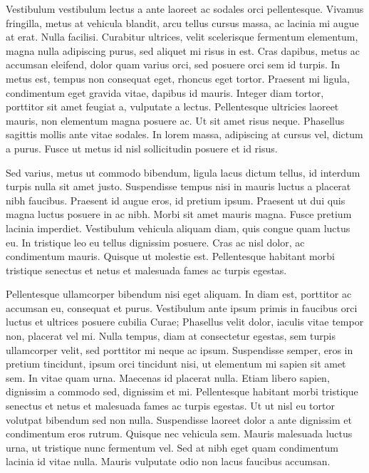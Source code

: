 \documentclass[a4paper]{article}
\begin{document}
Vestibulum vestibulum lectus a ante laoreet ac sodales orci pellentesque. Vivamus fringilla, metus at vehicula blandit, arcu tellus cursus massa, ac lacinia mi augue at erat. Nulla facilisi. Curabitur ultrices, velit scelerisque fermentum elementum, magna nulla adipiscing purus, sed aliquet mi risus in est. Cras dapibus, metus ac accumsan eleifend, dolor quam varius orci, sed posuere orci sem id turpis. In metus est, tempus non consequat eget, rhoncus eget tortor. Praesent mi ligula, condimentum eget gravida vitae, dapibus id mauris. Integer diam tortor, porttitor sit amet feugiat a, vulputate a lectus. Pellentesque ultricies laoreet mauris, non elementum magna posuere ac. Ut sit amet risus neque. Phasellus sagittis mollis ante vitae sodales. In lorem massa, adipiscing at cursus vel, dictum a purus. Fusce ut metus id nisl sollicitudin posuere et id risus.

Sed varius, metus ut commodo bibendum, ligula lacus dictum tellus, id interdum turpis nulla sit amet justo. Suspendisse tempus nisi in mauris luctus a placerat nibh faucibus. Praesent id augue eros, id pretium ipsum. Praesent ut dui quis magna luctus posuere in ac nibh. Morbi sit amet mauris magna. Fusce pretium lacinia imperdiet. Vestibulum vehicula aliquam diam, quis congue quam luctus eu. In tristique leo eu tellus dignissim posuere. Cras ac nisl dolor, ac condimentum mauris. Quisque ut molestie est. Pellentesque habitant morbi tristique senectus et netus et malesuada fames ac turpis egestas.

Pellentesque ullamcorper bibendum nisi eget aliquam. In diam est, porttitor ac accumsan eu, consequat et purus. Vestibulum ante ipsum primis in faucibus orci luctus et ultrices posuere cubilia Curae; Phasellus velit dolor, iaculis vitae tempor non, placerat vel mi. Nulla tempus, diam at consectetur egestas, sem turpis ullamcorper velit, sed porttitor mi neque ac ipsum. Suspendisse semper, eros in pretium tincidunt, ipsum orci tincidunt nisi, ut elementum mi sapien sit amet sem. In vitae quam urna. Maecenas id placerat nulla. Etiam libero sapien, dignissim a commodo sed, dignissim et mi. Pellentesque habitant morbi tristique senectus et netus et malesuada fames ac turpis egestas. Ut ut nisl eu tortor volutpat bibendum sed non nulla. Suspendisse laoreet dolor a ante dignissim et condimentum eros rutrum. Quisque nec vehicula sem. Mauris malesuada luctus urna, ut tristique nunc fermentum vel. Sed at nibh eget quam condimentum lacinia id vitae nulla. Mauris vulputate odio non lacus faucibus accumsan.
\end{document}
